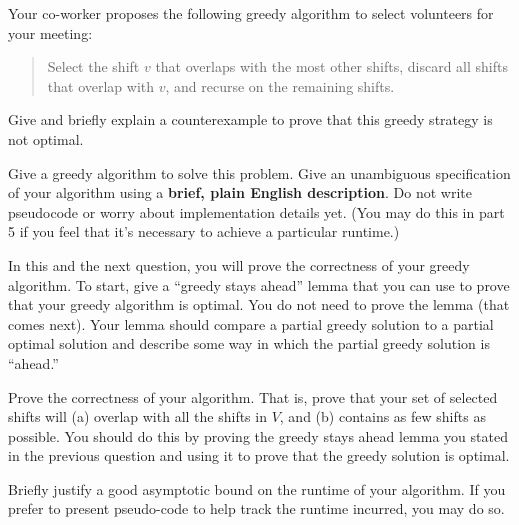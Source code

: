 \begin{questions}
\question[2] Your co-worker proposes the following greedy algorithm to select volunteers for your meeting:
\begin{quote}
    Select the shift $v$ that overlaps with the most other shifts, discard all shifts that overlap with $v$, and recurse on the remaining shifts.
\end{quote}
Give and briefly explain a counterexample to prove that this greedy strategy is not optimal.

\ifsolutions\fi 

\question[3] Give a greedy algorithm to solve this problem. Give an unambiguous specification of your algorithm using  a \textbf{brief, plain English description}. Do not write pseudocode or worry about implementation details yet. (You may do this in part 5 if you feel that it's necessary to achieve a particular runtime.)

\ifsolutions\fi 

\question[2] In this and the next question, you will prove the correctness of your greedy algorithm. To start, give a ``greedy stays ahead'' lemma that you can use to prove that your greedy algorithm is optimal. You do not need to prove the lemma (that comes next). Your lemma should compare a partial greedy solution to a partial optimal solution and describe some way in which the partial greedy solution is ``ahead.''

\ifsolutions\fi

\question[4] Prove the correctness of your algorithm. That is, prove that your set of selected shifts will (a) overlap with all the shifts in $V$, and (b) contains as few shifts as possible. You should do this by proving the greedy stays ahead lemma you stated in the previous question and using it to prove that the greedy solution is optimal.

\ifsolutions\fi 

\question[4] Briefly justify a good asymptotic bound on the runtime of your algorithm. If you prefer to present pseudo-code to help track the runtime incurred, you may do so.

\ifsolutions\fi 

\end{questions}